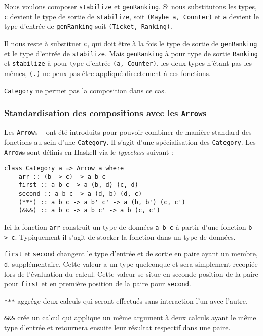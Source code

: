 \documentclass{llncs}
\newcommand{\Arrs}{\lstinline{Arrow}s }
\begin{document}
Nous voulons composer \lstinline{stabilize} et \lstinline{genRanking}.
Si nous substitutons les types, \lstinline{c} devient le type de sortie de \lstinline{stabilize},
soit \lstinline{(Maybe a, Counter)} et \lstinline{a} devient le type d'entrée de
\lstinline{genRanking} soit \lstinline{(Ticket, Ranking)}.

Il nous reste à substituer \lstinline{c}, qui doit être à la fois le type de sortie
de \lstinline{genRanking} et le type d'entrée de \lstinline{stabilize}.
Mais \lstinline{genRanking} à pour type de sortie \lstinline{Ranking}
et \lstinline{stabilize} à pour type d'entrée \lstinline{(a, Counter)},
les deux types n'étant pas les mêmes, \lstinline{(.)} ne peux pas être appliqué
directement à ces fonctions.

\lstinline{Category} ne permet pas la composition dans ce cas.

\subsubsection{Standardisation des compositions avec les \Arrs}
Les \Arrs~\cite{Hughes00} ont été introduits pour pouvoir combiner de manière
standard des fonctions au sein d'une \lstinline{Category}.
Il s'agit d'une spécialisation des \lstinline{Category}.
Les \Arrs sont définis en Haskell via le \emph{typeclass} suivant :
\begin{lstlisting}
class Category a => Arrow a where
    arr :: (b -> c) -> a b c
    first :: a b c -> a (b, d) (c, d)
    second :: a b c -> a (d, b) (d, c)
    (***) :: a b c -> a b' c' -> a (b, b') (c, c')
    (&&&) :: a b c -> a b c' -> a b (c, c')
\end{lstlisting}

Ici la fonction \lstinline{arr} construit un type de données
\lstinline{a b c} à partir d'une fonction \lstinline{b -> c}.
Typiquement il s'agit de stocker la fonction dans un type de données.

\lstinline{first} et \lstinline{second} changent le type d'entrée et de sortie
en paire ayant un membre, \lstinline{d}, supplémentaire.
Cette valeur a un type quelconque et sera simplement recopiée lors de l'évaluation
du calcul.
Cette valeur se situe en seconde position de la paire pour \lstinline{first} et en
première position de la paire pour \lstinline{second}.

\lstinline{***} aggrége deux calculs qui seront effectués sans interaction l'un
avec l'autre.

\lstinline{&&&} crée un calcul qui applique un même argument à deux calculs ayant
le même type d'entrée et retournera ensuite leur résultat respectif dans une paire.
\end{document}
